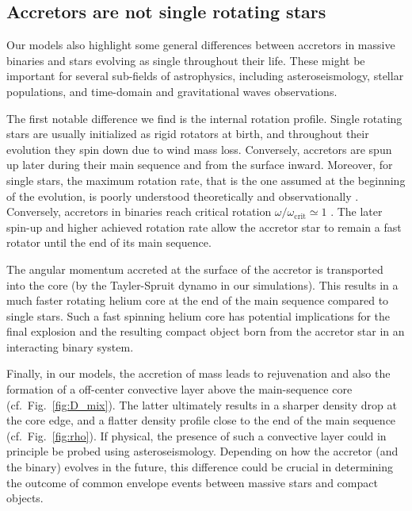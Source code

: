 \documentclass[twocolumn,twocolappendix,trackchanges]{aastex63}
\DeclareRobustCommand{\Figref}[1]{Fig.~\ref{#1}}
\begin{document}
\subsection{Accretors are not single rotating stars}

Our models also highlight some general differences between accretors in massive
binaries and stars evolving as single throughout their life. These
might be important for several
sub-fields of astrophysics, including asteroseismology, stellar
populations, and time-domain and gravitational waves observations.

The first notable difference we find is the internal rotation
profile. Single rotating stars are usually initialized as rigid
rotators at birth, and throughout their evolution they spin down due
to wind mass loss. Conversely, accretors are spun up later during
their main sequence and from the surface inward. Moreover,
for single stars, the maximum rotation rate, that is the one assumed
at the beginning of the evolution, is poorly understood theoretically
and observationally \citep[e.g.,][]{ramirez-agudelo:13,
  ramirez-agudelo:15}. Conversely, accretors in binaries reach
critical rotation $\omega/\omega_\mathrm{crit}\simeq 1$
\citep[e.g.,][]{packet:81}. The later spin-up and higher achieved
rotation rate allow the accretor star to remain a fast rotator until
the end of its main sequence.

The angular momentum accreted at the surface of the accretor is
transported into the core (by the Tayler-Spruit dynamo in our
simulations). This results in a much faster rotating helium core at
the end of the main sequence compared to single stars. Such a fast
spinning helium core has potential implications for the final
explosion and the resulting compact object born from the accretor star
in an interacting binary system.

Finally, in our models, the accretion of mass leads to rejuvenation
and also the formation of a off-center convective layer above the
main-sequence core (cf.\ \Figref{fig:D_mix}). The latter ultimately
results in a sharper density drop at the core edge, and a flatter
density profile close to the end of the main sequence (cf.\
\Figref{fig:rho}). If physical,
the presence of such a convective layer could in principle be probed
using asteroseismology. Depending on how the accretor (and the binary)
evolves in the future, this difference could be crucial in determining
the outcome of common
envelope events between massive stars and compact objects.\\
\end{document}
